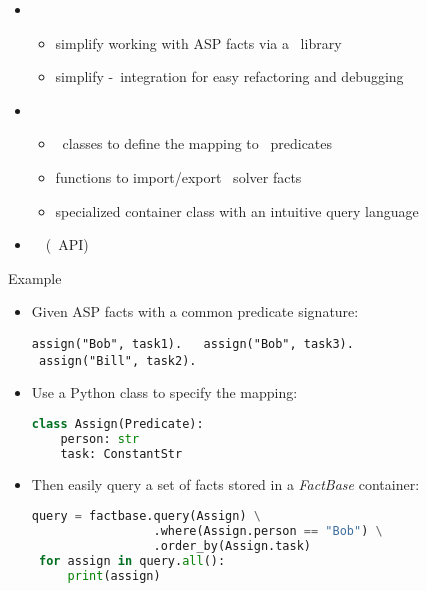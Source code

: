 \begin{frame}{\clorm}
  \begin{itemize}
  \item {} \
    \begin{itemize}
    \item simplify working with ASP facts via a \python\ library
    \item simplify \python-\clingo\ integration for easy refactoring and debugging
      \end{itemize}
  \item {} \
    \begin{itemize}
    \item \python\ classes to define the mapping to \clingo\ predicates
    \item functions to import/export \clingo\ solver facts
    \item specialized container class with an intuitive query language
    \end{itemize}
  \item \structure{Technology}   \ \clingo\ (\python\ API)
  \end{itemize}
\end{frame}
\begin{frame}[fragile]{Example}

  \begin{itemize}
  \item Given ASP facts with a common predicate signature:

\begin{lstlisting}[language=clingo,basicstyle=\small\ttfamily]
 assign("Bob", task1).   assign("Bob", task3).
 assign("Bill", task2).
\end{lstlisting}

  \item Use a Python class to specify the mapping:

\begin{lstlisting}[language=Python, basicstyle=\small\ttfamily]
 class Assign(Predicate):
    person: str
    task: ConstantStr
\end{lstlisting}

  \item Then easily query a set of facts stored in a \emph{FactBase} container:

\begin{lstlisting}[language=Python, basicstyle=\small\ttfamily]
 query = factbase.query(Assign) \
                 .where(Assign.person == "Bob") \
                 .order_by(Assign.task)
 for assign in query.all():
     print(assign)
\end{lstlisting}
  \end{itemize}
\end{frame}
%

